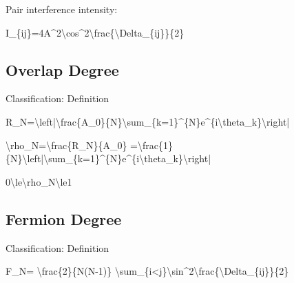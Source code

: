 \documentclass[
  a4paper,
]{article}
\newenvironment{Shaded}{}{}
\newcommand{\NormalTok}[1]{#1}
\begin{document}
Pair interference intensity:

\begin{Shaded}
\begin{Highlighting}[]
\NormalTok{I\_\{ij\}=4A\^{}2\textbackslash{}cos\^{}2\textbackslash{}frac\{\textbackslash{}Delta\_\{ij\}\}\{2\}}
\end{Highlighting}
\end{Shaded}

\subsection{Overlap Degree}\label{overlap-degree}

Classification: Definition

\begin{Shaded}
\begin{Highlighting}[]
\NormalTok{R\_N=\textbackslash{}left|\textbackslash{}frac\{A\_0\}\{N\}\textbackslash{}sum\_\{k=1\}\^{}\{N\}e\^{}\{i\textbackslash{}theta\_k\}\textbackslash{}right|}
\end{Highlighting}
\end{Shaded}

\begin{Shaded}
\begin{Highlighting}[]
\NormalTok{\textbackslash{}rho\_N=\textbackslash{}frac\{R\_N\}\{A\_0\}}
\NormalTok{=\textbackslash{}frac\{1\}\{N\}\textbackslash{}left|\textbackslash{}sum\_\{k=1\}\^{}\{N\}e\^{}\{i\textbackslash{}theta\_k\}\textbackslash{}right|}
\end{Highlighting}
\end{Shaded}

\begin{Shaded}
\begin{Highlighting}[]
\NormalTok{0\textbackslash{}le\textbackslash{}rho\_N\textbackslash{}le1}
\end{Highlighting}
\end{Shaded}

\subsection{Fermion Degree}\label{fermion-degree}

Classification: Definition

\begin{Shaded}
\begin{Highlighting}[]
\NormalTok{F\_N=}
\NormalTok{\textbackslash{}frac\{2\}\{N(N{-}1)\}}
\NormalTok{\textbackslash{}sum\_\{i\textless{}j\}\textbackslash{}sin\^{}2\textbackslash{}frac\{\textbackslash{}Delta\_\{ij\}\}\{2\}}
\end{Highlighting}
\end{Shaded}
\end{document}
